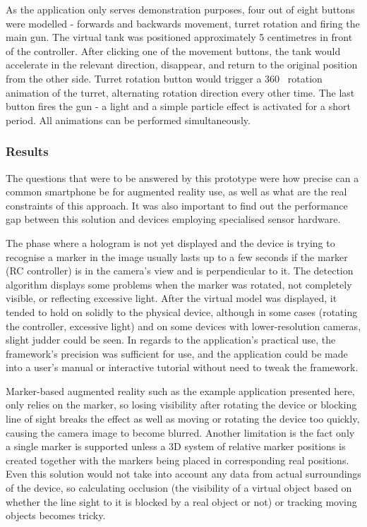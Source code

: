 \documentclass[12pt, a4paper]{article}
\begin{document}
As the application only serves demonstration purposes, four out of eight buttons were modelled - forwards and backwards movement, turret rotation and firing the main gun. The virtual tank was positioned approximately 5 centimetres in front of the controller. After clicking one of the movement buttons, the tank would accelerate in the relevant direction, disappear, and return to the original position from the other side. Turret rotation button would trigger a 360\degree~ rotation animation of the turret, alternating rotation direction every other time. The last button fires the gun - a light and a simple particle effect is activated for a short period. All animations can be performed simultaneously.

\subsubsection{Results}
The questions that were to be answered by this prototype were how precise can a common smartphone be for augmented reality use, as well as what are the real constraints of this approach. It was also important to find out the performance gap between this solution and devices employing specialised sensor hardware.

The phase where a hologram is not yet displayed and the device is trying to recognise a marker in the image usually lasts up to a few seconds if the marker (RC controller) is in the camera’s view and is perpendicular to it. The detection algorithm displays some problems when the marker was rotated, not completely visible, or reflecting excessive light. After the virtual model was displayed, it tended to hold on solidly to the physical device, although in some cases (rotating the controller, excessive light) and on some devices with lower-resolution cameras, slight judder could be seen. In regards to the application’s practical use, the framework’s precision was sufficient for use, and the application could be made into a user’s manual or interactive tutorial without need to tweak the framework.

Marker-based augmented reality such as the example application presented here, only relies on the marker, so losing visibility after rotating the device or blocking line of sight breaks the effect as well as moving or rotating the device too quickly, causing the camera image to become blurred. Another limitation is the fact only a single marker is supported unless a 3D system of relative marker positions is created together with the markers being placed in corresponding real positions. Even this solution would not take into account any data from actual surroundings of the device, so calculating occlusion (the visibility of a virtual object based on whether the line sight to it is blocked by a real object or not) or tracking moving objects becomes tricky.
\end{document}
